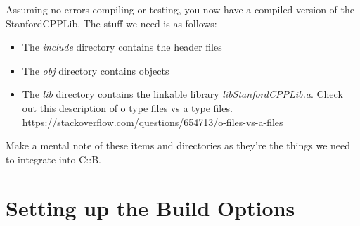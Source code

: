 \documentclass[10pt]{article}
\begin{document}
Assuming no errors compiling or testing, you now have a compiled version of the StanfordCPPLib. The stuff we need is as follows:
\begin{itemize}
\item The \textit{include} directory contains the header files
\item The \textit{obj} directory contains objects
\item The \textit{lib} directory contains the linkable library \textit{libStanfordCPPLib.a}. Check out this description of o type files vs a type files. \url{https://stackoverflow.com/questions/654713/o-files-vs-a-files}
\end{itemize}
Make a mental note of these items and directories as they're the things we need to integrate into C::B.

\section{ Setting up the Build Options }
\end{document}
